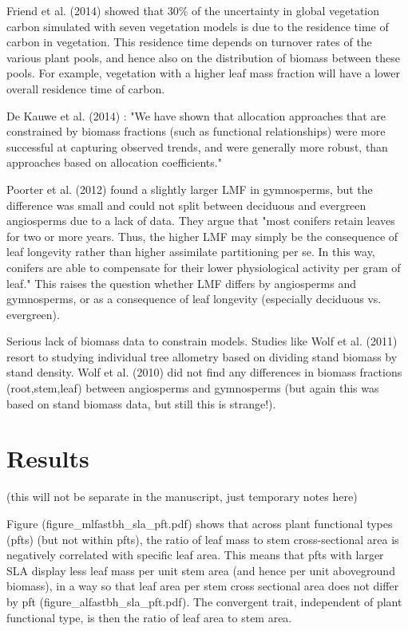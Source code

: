 \documentclass[a4paper]{article}
\begin{document}
Friend et al. (2014) showed that 30\% of the uncertainty in global vegetation carbon simulated with seven vegetation models is due to the residence time of carbon in vegetation. This residence time depends on turnover rates of the various plant pools, and hence also on the distribution of biomass between these pools. For example, vegetation with a higher leaf mass fraction will have a lower overall residence time of carbon.

De Kauwe et al. (2014) : "We have shown that allocation approaches that are constrained by biomass fractions (such as functional relationships) were more successful at capturing observed trends, and were generally more robust, than approaches based on allocation coefficients."

Poorter et al. (2012) found a slightly larger LMF in gymnosperms, but the difference was small and could not split between deciduous and evergreen angiosperms due to a lack of data. They argue that "most conifers retain leaves for two or more years. Thus, the higher LMF may simply be the consequence of leaf longevity rather than higher assimilate partitioning per se. In this way, conifers are able to compensate for their lower physiological activity per gram of leaf." This raises the question whether LMF differs by angiosperms and gymnosperms, or as a consequence of leaf longevity (especially deciduous vs. evergreen).

Serious lack of biomass data to constrain models. Studies like Wolf et al. (2011) resort to studying individual tree allometry based on dividing stand biomass by stand density. Wolf et al. (2010) did not find any differences in biomass fractions (root,stem,leaf) between angiosperms and gymnosperms (but again this was based on stand biomass data, but still this is strange!).


\section{Results}
(this will not be separate in the manuscript, just temporary notes here)

Figure (figure\_mlfastbh\_sla\_pft.pdf) shows that across plant functional types (pfts) (but not within pfts), the ratio of leaf mass to stem cross-sectional area is negatively correlated with specific leaf area. This means that pfts with larger SLA display less leaf mass per unit stem area (and hence per unit aboveground biomass), in a way so that leaf area per stem cross sectional area does not differ by pft (figure\_alfastbh\_sla\_pft.pdf). The convergent trait, independent of plant functional type, is then the ratio of leaf area to stem area.
\end{document}
